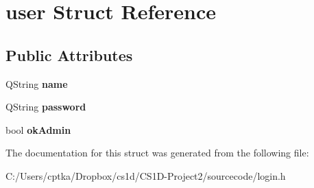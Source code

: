 \hypertarget{structuser}{}\section{user Struct Reference}
\label{structuser}
\subsection*{Public Attributes}
\begin{DoxyCompactItemize}
\item 
\mbox{\label{structuser_ad044cc7054ee3116809f97698017eb49}} 
Q\+String {\bfseries name}
\item 
\mbox{\label{structuser_a2b1a33adf680f13f15e5071f73e0279f}} 
Q\+String {\bfseries password}
\item 
\mbox{\label{structuser_a5bcd830122f771605cf429ef5b902759}} 
bool {\bfseries ok\+Admin}
\end{DoxyCompactItemize}


The documentation for this struct was generated from the following file\+:\begin{DoxyCompactItemize}
\item 
C\+:/\+Users/cptka/\+Dropbox/cs1d/\+C\+S1\+D-\/\+Project2/sourcecode/login.\+h\end{DoxyCompactItemize}
